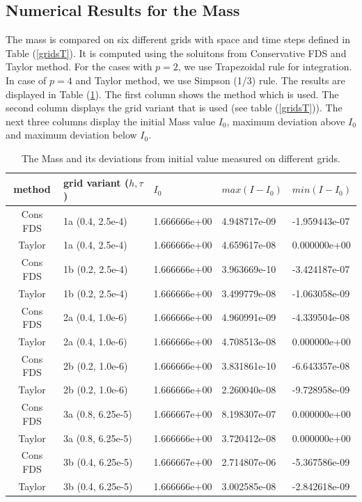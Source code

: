 \documentclass[%
 aip,
cp,  
 amsmath,amssymb,
 reprint,
]{iopconfser}
\newcommand{\rf}[1]{(\ref{#1})}
\begin{document}
\subsection{Numerical Results for the Mass}
The mass is compared on six different grids with space and time steps defined in Table \rf{gridsT}. It is computed using the soluitons from Conservative FDS and Taylor method. For the cases with 
$p=2$, we use Trapezoidal rule for integration. In case of $p=4$ and Taylor method, we use Simpson (1/3) rule. The results are displayed in Table \rf{tableMass}. The first column shows the method which is used. The second column displays the grid variant that is used (see table \rf{gridsT}). The next three columns display the initial Mass value $I_0$, maximum deviation above $I_0$ and maximum deviation below $I_0$.
\begin{table}[ht]
\centering
\small
		\begin{tabular}{||c|l|l|l|l||}
			\hline
method        & grid variant ($h,\tau$)& $I_0$ &   $max(I-I_0)$ & $min(I-I_0)$  \\
   			\hline 
Cons FDS            &  1a (0.4, 2.5e-4) & 1.666666e+00 &  4.948717e-09 & -1.959443e-07                    \\
 Taylor               &  1a (0.4, 2.5e-4) & 1.666666e+00 &  4.659617e-08 & 0.000000e+00                \\
Cons FDS            &  1b (0.2, 2.5e-4) & 1.666666e+00 & 3.963669e-10 & -3.424187e-07             \\
 Taylor               &  1b (0.2, 2.5e-4) & 1.666666e+00 & 3.499779e-08 & -1.063058e-09               \\
	   		\hline
			\hline
Cons FDS             & 2a (0.4, 1.0e-6) & 1.666666e+00 & 4.960991e-09 & -4.339504e-08                    \\
 Taylor                & 2a (0.4, 1.0e-6) & 1.666666e+00 & 4.708513e-08 & 0.000000e+00                   \\
Cons FDS            & 2b (0.2, 1.0e-6) & 1.666666e+00 & 3.831861e-10 & -6.643357e-08                  \\
 Taylor                & 2b (0.2, 1.0e-6) & 1.666666e+00 & 2.260040e-08 & -9.728958e-09                      \\
	   		\hline
			\hline
Cons FDS           &  3a (0.8, 6.25e-5) & 1.666667e+00 & 8.198307e-07 & 0.000000e+00                    \\
Taylor                &  3a (0.8, 6.25e-5) & 1.666666e+00 &  3.720412e-08 & 0.000000e+00                      \\
Cons FDS           &  3b (0.4, 6.25e-5) & 1.666667e+00 &  2.714807e-06 & -5.367586e-09                     \\
Taylor                &  3b (0.4, 6.25e-5) & 1.666666e+00 &  3.002585e-08 & -2.842618e-09                      \\
			\hline 
			\hline
		\end{tabular}
		\caption{ The Mass and its deviations from initial value measured on different grids. }
\label{tableMass}
\end{table}
\end{document}
